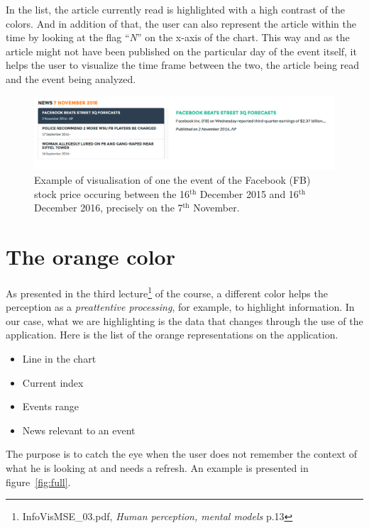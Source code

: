 In the list, the article currently read is highlighted with a high contrast of the colors. And in addition of that, the user can also represent the article within the time by looking at the flag ``\textit{N}'' on the x-axis of the chart. This way and as the article might not have been published on the particular day of the event itself, it helps the user to visualize the time frame between the two, the article being read and the event being analyzed.

\begin{figure}
    \centering
    \includegraphics[max width=\textwidth]{Figures/st-news.png}
    \caption{Example of visualisation of one the event of the Facebook (FB) stock price occuring between the 16$^{\text{th}}$ December 2015 and 16$^{\text{th}}$ December 2016, precisely on the 7$^{\text{th}}$ November.}
    \label{fig:news}
\end{figure}

\section{The orange color}
As presented in the third lecture\footnote{InfoVisMSE\_03.pdf, \textit{Human perception, mental models} p.13} of the course, a different color helps the perception as a \textit{preattentive processing}, for example, to highlight information. In our case, what we are highlighting is the data that changes through the use of the application. Here is the list of the orange representations on the application.
\begin{itemize}
    \item Line in the chart
    \item Current index
    \item Events range
    \item News relevant to an event
\end{itemize}
The purpose is to catch the eye when the user does not remember the context of what he is looking at and needs a refresh. An example is presented in figure~\ref{fig:full}.

